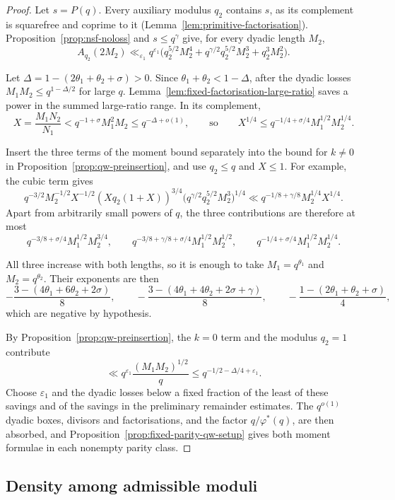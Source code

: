 \documentclass[12pt, a4paper]{amsart}
\numberwithin{equation}{section}
\renewcommand{\le}{\leqslant}
\theoremstyle{plain}
\begin{document}
\begin{proof}
Let $s=P(q)$. Every auxiliary modulus $q_2$ contains $s$, as its complement is squarefree and coprime to it (Lemma~\ref{lem:primitive-factorisation}). Proposition~\ref{prop:nsf-noloss} and $s\le q^\gamma$ give, for every dyadic length $M_2$,
$$
A_{q_2}(2M_2)\ll_{\varepsilon_1}q^{\varepsilon_1}\bigl(q_2^{5/2}M_2^4+q^{\gamma/2}q_2^{5/2}M_2^3+q_2^3M_2^2\bigr).
$$

Let $\Delta=1-(2\theta_1+\theta_2+\sigma)>0$. Since $\theta_1+\theta_2<1-\Delta$, after the dyadic losses $M_1M_2\le q^{1-\Delta/2}$ for large $q$. Lemma~\ref{lem:fixed-factorisation-large-ratio} saves a power in the summed large-ratio range. In its complement,
$$
X=\frac{M_1N_2}{N_1}<q^{-1+\sigma}M_1^2M_2\le q^{-\Delta+o(1)},\qquad\text{so}\qquad X^{1/4}\le q^{-1/4+\sigma/4}M_1^{1/2}M_2^{1/4}.
$$

Insert the three terms of the moment bound separately into the bound for $k\ne0$ in Proposition~\ref{prop:qw-preinsertion}, and use $q_2\le q$ and $X\le1$. For example, the cubic term gives
$$
q^{-3/2}M_2^{-1/2}X^{-1/2}(Xq_2(1+X))^{3/4}\bigl(q^{\gamma/2}q_2^{5/2}M_2^3\bigr)^{1/4}\ll q^{-1/8+\gamma/8}M_2^{1/4}X^{1/4}.
$$
Apart from arbitrarily small powers of $q$, the three contributions are therefore at most
$$
q^{-3/8+\sigma/4}M_1^{1/2}M_2^{3/4},\qquad
q^{-3/8+\gamma/8+\sigma/4}M_1^{1/2}M_2^{1/2},\qquad
q^{-1/4+\sigma/4}M_1^{1/2}M_2^{1/4}.
$$

All three increase with both lengths, so it is enough to take $M_1=q^{\theta_1}$ and $M_2=q^{\theta_2}$. Their exponents are then
$$
-\frac{3-(4\theta_1+6\theta_2+2\sigma)}{8},\qquad
-\frac{3-(4\theta_1+4\theta_2+2\sigma+\gamma)}{8},\qquad
-\frac{1-(2\theta_1+\theta_2+\sigma)}{4},
$$
which are negative by hypothesis.

By Proposition~\ref{prop:qw-preinsertion}, the $k=0$ term and the modulus $q_2=1$ contribute
$$
\ll q^{\varepsilon_1}\frac{(M_1M_2)^{1/2}}q\le q^{-1/2-\Delta/4+\varepsilon_1}.
$$
Choose $\varepsilon_1$ and the dyadic losses below a fixed fraction of the least of these savings and of the savings in the preliminary remainder estimates. The $q^{o(1)}$ dyadic boxes, divisors and factorisations, and the factor $q/\varphi^*(q)$, are then absorbed, and Proposition~\ref{prop:fixed-parity-qw-setup} gives both moment formulae in each nonempty parity class.
\end{proof}

\subsection{Density among admissible moduli}
\end{document}
